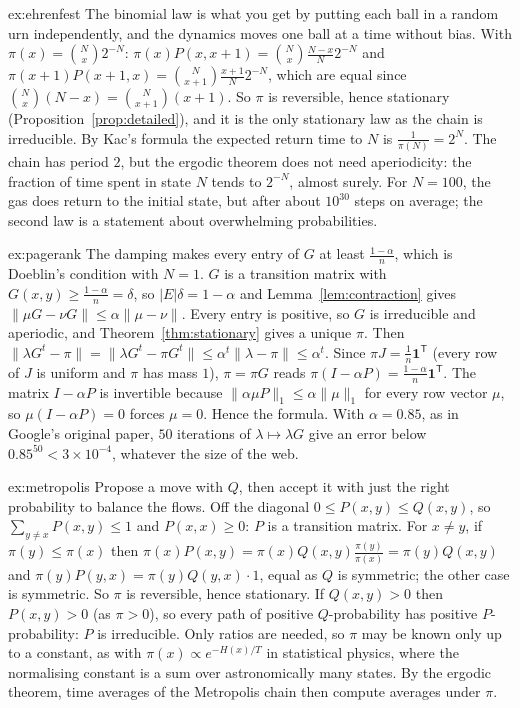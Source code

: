 \begin{solution}{ex:ehrenfest}
\idea The binomial law is what you get by putting each ball in a random urn independently, and the dynamics moves one
ball at a time without bias.
\writeup With $\pi(x)=\binom Nx2^{-N}$: $\pi(x)P(x,x+1)=\binom Nx\frac{N-x}N2^{-N}$ and $\pi(x+1)P(x+1,x)=\binom N{x+1}\frac{x+1}N2^{-N}$, which are equal since $\binom Nx(N-x)=\binom N{x+1}(x+1)$. So $\pi$ is
reversible, hence stationary (Proposition~\ref{prop:detailed}), and it is the only stationary law as the chain is irreducible. By Kac's formula
the expected return time to $N$ is $\frac1{\pi(N)}=2^N$. The chain has period $2$, but the ergodic theorem does not need aperiodicity: the fraction
of time spent in state $N$ tends to $2^{-N}$, almost surely. For $N=100$, the gas does return to the initial state, but after about $10^{30}$
steps on average; the second law is a statement about overwhelming probabilities.
\end{solution}

\begin{solution}{ex:pagerank}
\idea The damping makes every entry of $G$ at least $\frac{1-\alpha}n$, which is Doeblin's condition with $N=1$.
\writeup $G$ is a transition matrix with $G(x,y)\ge\frac{1-\alpha}n=\delta$, so $|E|\delta=1-\alpha$ and Lemma~\ref{lem:contraction} gives $\|\mu G-\nu G\|\le\alpha\|\mu-\nu\|$. Every entry
is positive, so $G$ is irreducible and aperiodic, and Theorem~\ref{thm:stationary} gives a unique $\pi$. Then $\|\lambda G^t-\pi\|=\|\lambda G^t-\pi G^t\|\le\alpha^t\|\lambda-\pi\|\le\alpha^t$. Since
$\pi J=\frac1n\mathbf 1^{\mathsf T}$ (every row of $J$ is uniform and $\pi$ has mass $1$), $\pi=\pi G$ reads $\pi(I-\alpha P)=\frac{1-\alpha}n\mathbf 1^{\mathsf T}$. The matrix $I-\alpha P$ is invertible because
$\|\alpha\mu P\|_1\le\alpha\|\mu\|_1$ for every row vector $\mu$, so $\mu(I-\alpha P)=0$ forces $\mu=0$. Hence the formula. With $\alpha=0.85$, as in Google's original paper, $50$
iterations of $\lambda\mapsto\lambda G$ give an error below $0.85^{50}<3\times10^{-4}$, whatever the size of the web.
\end{solution}

\begin{solution}{ex:metropolis}
\idea Propose a move with $Q$, then accept it with just the right probability to balance the flows.
\writeup Off the diagonal $0\le P(x,y)\le Q(x,y)$, so $\sum_{y\ne x}P(x,y)\le1$ and $P(x,x)\ge0$: $P$ is a transition matrix. For $x\ne y$, if $\pi(y)\le\pi(x)$ then
$\pi(x)P(x,y)=\pi(x)Q(x,y)\frac{\pi(y)}{\pi(x)}=\pi(y)Q(x,y)$ and $\pi(y)P(y,x)=\pi(y)Q(y,x)\cdot1$, equal as $Q$ is symmetric; the other case is symmetric. So $\pi$ is reversible,
hence stationary. If $Q(x,y)>0$ then $P(x,y)>0$ (as $\pi>0$), so every path of positive $Q$-probability has positive $P$-probability: $P$ is irreducible.
Only ratios are needed, so $\pi$ may be known only up to a constant, as with $\pi(x)\propto e^{-H(x)/T}$ in statistical physics, where the normalising
constant is a sum over astronomically many states. By the ergodic theorem, time averages of the Metropolis chain then compute
averages under $\pi$.
\end{solution}

